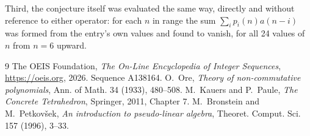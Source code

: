 \documentclass[11pt,a4paper]{article}
\theoremstyle{plain}
\theoremstyle{definition}
\begin{document}
Third, the conjecture itself was evaluated the same way, directly and without reference to
either operator: for each $n$ in range the sum $\sum_{i}p_{i}(n)a(n-i)$ was formed from the
entry's own values and found to vanish, for all 24 values of $n$ from
$n=6$ upward.

\begin{thebibliography}{9}
 The OEIS Foundation, \emph{The On-Line Encyclopedia of Integer Sequences},
\url{https://oeis.org}, 2026. Sequence A138164.
 O.~Ore, \emph{Theory of non-commutative polynomials}, Ann. of Math. 34
(1933), 480--508.
 M.~Kauers and P.~Paule, \emph{The Concrete Tetrahedron}, Springer, 2011,
Chapter 7.
 M.~Bronstein and M.~Petkov\v{s}ek, \emph{An introduction to
pseudo-linear algebra}, Theoret. Comput. Sci. 157 (1996), 3--33.
\end{thebibliography}
\end{document}
